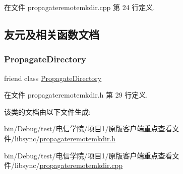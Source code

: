 在文件 propagateremotemkdir.\+cpp 第 24 行定义.



\subsection{友元及相关函数文档}
\mbox{\label{class_o_c_c_1_1_propagate_remote_mkdir_a618ad365a131b514f7ee1c324b844ff4}} 
\subsubsection{\texorpdfstring{Propagate\+Directory}{PropagateDirectory}}
{\footnotesize\ttfamily friend class \hyperlink{class_o_c_c_1_1_propagate_directory}{Propagate\+Directory}\hspace{0.3cm}{\ttfamily [friend]}}



在文件 propagateremotemkdir.\+h 第 29 行定义.



该类的文档由以下文件生成\+:\begin{DoxyCompactItemize}
\item 
bin/\+Debug/test/电信学院/项目1/原版客户端重点查看文件/libsync/\hyperlink{propagateremotemkdir_8h}{propagateremotemkdir.\+h}\item 
bin/\+Debug/test/电信学院/项目1/原版客户端重点查看文件/libsync/\hyperlink{propagateremotemkdir_8cpp}{propagateremotemkdir.\+cpp}\end{DoxyCompactItemize}
